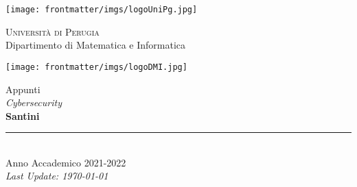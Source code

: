 
\thispagestyle{empty} %

\noindent %
\texttt{[image: frontmatter/imgs/logoUniPg.jpg]}
\begin{minipage}[b]{0.7\textwidth}
    \centering
    {\Large \textsc{Universit{\`a} di Perugia}}\\
    \vspace{0.4 em}
    {\large Dipartimento di Matematica e Informatica}
    \vspace{0.6 em}
\end{minipage}%
\texttt{[image: frontmatter/imgs/logoDMI.jpg]}

\vspace{8 em}

\begin{center}
    {\Huge Appunti}\\
    \vspace{1 em}
    {\Huge \textit{Cybersecurity}}\\
    \vspace{5 em}
    {\Huge \textbf{Santini}}\\

    \vfill

    \rule{380pt}{.4pt}\\
    \vspace{1.2 em}
    \large{Anno Accademico 2021-2022}\\
    \vspace{.9 em}
    \small{\textit{Last Update: \today{}}}
\end{center}

